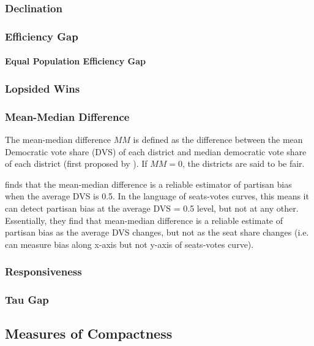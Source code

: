 \subsubsection{Declination}

\subsubsection{Efficiency Gap}

\paragraph{Equal Population Efficiency Gap}

\subsubsection{Lopsided Wins}

\subsubsection{Mean-Median Difference}

The mean-median difference $MM$ is defined as the difference between the mean Democratic vote share (DVS) of each district and median democratic vote share of each district (first proposed by \textcite{mcdonald2015}). If $MM = 0$, the districts are said to be fair. 

\textcite{katz2020} finds that the mean-median difference is a reliable estimator of partisan bias when the average DVS is 0.5. In the language of seats-votes curves, this means it can detect partisan bias at the average DVS = 0.5 level, but not at any other. Essentially, they find that mean-median difference is a reliable estimate of partisan bias as the average DVS changes, but not as the seat share changes (i.e. can measure bias along x-axis but not y-axis of seats-votes curve). \parencite[27-9]{katz2020}

\subsubsection{Responsiveness}

\subsubsection{Tau Gap}

\subsection{Measures of Compactness}


